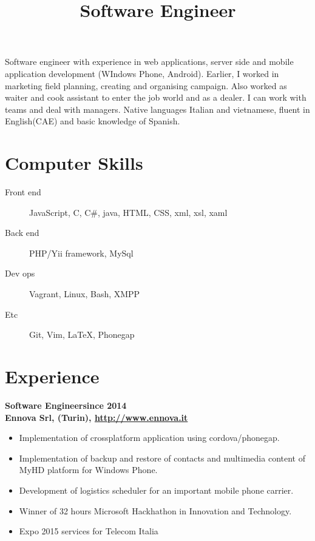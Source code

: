 \documentclass[a4paper,sans,10pt]{moderncv} %
\title{Software Engineer}
\newcommand{\experience}{Experience}
\newcommand{\skills}{Computer Skills}
\begin{document}
\maketitle

	\vspace{-1.5em}  %
\justify
Software engineer with experience in web applications, server side and mobile application development (WIndows Phone, Android).
Earlier, I worked in marketing field planning, creating and organising campaign. Also worked as waiter and cook assistant to enter the job world and as a dealer.
I can work with teams and deal with managers.
Native languages Italian and vietnamese, fluent in English(CAE) and basic knowledge of Spanish.

\section{\skills}
\begin{description}
\item [Front end] JavaScript, C, C\#, java, HTML, CSS, xml, xsl, xaml
\item [Back end] PHP/Yii framework, MySql
\item [Dev ops] Vagrant, Linux, Bash, XMPP
\item [Etc] Git, Vim, LaTeX, Phonegap
\end{description}

  \section{\experience}

\renewcommand{\labelitemi}{\tiny$\blacksquare$}
  \textbf{Software Engineer}\hfill\textbf{since 2014}\\
  \textbf{Ennova Srl, (Turin), \url{http://www.ennova.it}}\\
\vspace{-1em}
  \begin{itemize}
  \item Implementation of crossplatform application using cordova/phonegap.
  \item Implementation of backup and restore of contacts and multimedia content of MyHD platform for Windows Phone.
  \item Development of logistics scheduler for an important mobile phone carrier.
  \item Winner of 32 hours Microsoft Hackhathon in Innovation and Technology.
\item Expo 2015 services for Telecom Italia
  \end{itemize}
\end{document}
